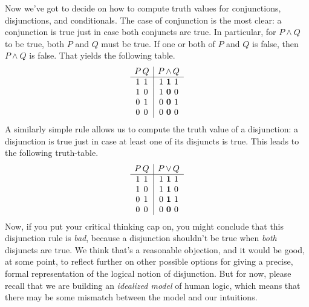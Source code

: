 Now we've got to decide on how to compute truth values for
conjunctions, disjunctions, and conditionals.  The case of conjunction
is the most clear: a conjunction is true just in case both conjuncts are
  true. In particular, for $P\wedge Q$ to be true, both
$P$ and $Q$ must be true.  If one or both of $P$ and $Q$ is false,
then $P\wedge Q$ is false. That yields the following table.
\[ \begin{array}{ c@{\, }c | c@{\, }c@{\, }c}
P & Q &  P & \wedge & Q  \\
\hline 
1 & 1 &  1 & \mathbf{1} & 1  \\
1 & 0 &  1 & \mathbf{0} & 0  \\
0 & 1 &  0 & \mathbf{0} & 1  \\
0 & 0 &  0 & \mathbf{0} & 0  \\
   \end{array} \]
 A similarly simple rule allows us to
 compute the truth value of a disjunction: a disjunction is true just in case at least one of its
 disjuncts is true. This leads to the following
 truth-table.
\[ \begin{array}{ c@{\, }c | c@{\, }c@{\, }c}
P & Q &  P & \vee & Q  \\
\hline 
1 & 1 &  1 & \mathbf{1} & 1  \\
1 & 0 &  1 & \mathbf{1} & 0  \\
0 & 1 &  0 & \mathbf{1} & 1  \\
0 & 0 &  0 & \mathbf{0} & 0  \\
   \end{array} \] 
 Now, if you put your critical thinking cap on, you might conclude that this disjunction rule is {\it
   bad}, because a disjunction shouldn't be true when {\it both}
 disjuncts are true.  We think that's a reasonable objection, and it
 would be good, at some point, to reflect further on other possible
 options for giving a precise, formal representation of the logical
 notion of disjunction.  But for now, please recall that we are
 building an {\it idealized model} of human logic, which means that
 there may be some mismatch between the model and our intuitions.

